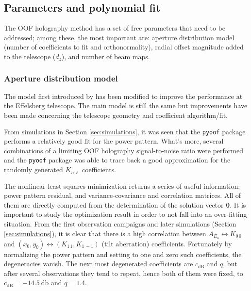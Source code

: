\documentclass[
    ]
    {aa}
\begin{document}

    \subsection{Parameters and polynomial fit}
    \label{sec:params_and_polynomial_fit}

    The OOF holography method has a set of free parameters that need to be addressed; among these, the most important are: aperture distribution model (number of coefficients to fit and orthonormality), radial offset magnitude added to the telescope ($d_z$), and number of beam maps.

    \subsubsection{Aperture distribution model}
    \label{sec:aperture_distribution_model}
    The model first introduced by \citep{2007A&A...465..679N} has been modified to improve the performance at the Effelsberg telescope. The main model is still the same but improvements have been made concerning the telescope geometry and coefficient algorithm/fit.

    From simulations in Section \ref{sec:simulations}, it was seen that the \texttt{pyoof} package performs a relatively good fit for the power pattern. What's more, several combinations of a limiting OOF holography signal-to-noise ratio were performed and the \texttt{pyoof} package was able to trace back a good approximation for the randomly generated $K_{n\,\ell}$ coefficients.

    The nonlinear least-squares minimization returns a series of useful information: power pattern residual, and variance-covariance and correlation matrices. All of them are directly computed from the determination of the solution vector $\boldsymbol\theta$. It is important to study the optimization result in order to not fall into an over-fitting situation. From the first observation campaigns and later simulations (Section \ref{sec:simulations}), it is clear that there is a high correlation between $A_{E_\text{a}}\leftrightarrow K_{0\,0}$ and $(x_0, y_0)\leftrightarrow(K_{1\,1}, K_{1\,-1})$ (tilt aberration) coefficients. Fortunately by normalizing the power pattern and setting to one and zero such coefficients, the degeneracies vanish. The next most degenerated coefficients are $c_\text{dB}$ and $q$, but after several observations they tend to repeat, hence both of them were fixed, to $c_\text{dB}=\SI{-14.5}{\decibel}$ and $q=1.4$.
\end{document}
